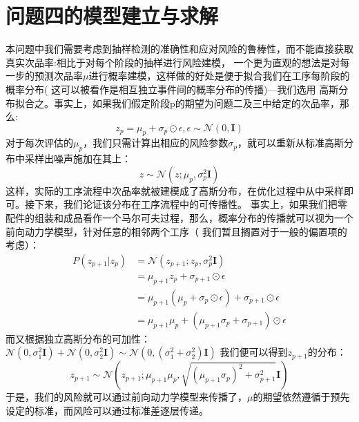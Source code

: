 \documentclass[withoutpreface,bwprint]{cumcmthesis} %
\begin{document}
\section{问题四的模型建立与求解}
本问题中我们需要考虑到抽样检测的准确性和应对风险的鲁棒性，而不能直接获取真实次品率:相比于对每个阶段的抽样进行风险建模，
一个更为直观的想法是对每一步的预测次品率$\mu$进行概率建模，这样做的好处是便于拟合我们在工序每阶段的概率分布(
这可以被看作是相互独立事件间的概率分布的传播)---我们选用
高斯分布拟合之。事实上，如果我们假定阶段p的期望为问题二及三中给定的次品率，那么:
\begin{equation}
	z_p = \mu_p + \sigma_p \odot \epsilon, \epsilon \sim \mathcal{N}(0, \mathbf{I})
\end{equation}
对于每次评估的$\mu_p$，我们只需计算出相应的风险参数$\sigma_p$，就可以重新从标准高斯分布中采样出噪声施加在其上：
\begin{equation}
	z \sim \mathcal{N}(z; \mu_p, \sigma_p^2 \mathbf{I})
\end{equation}
这样，实际的工序流程中次品率就被建模成了高斯分布，在优化过程中从中采样即可。接下来，我们论证该分布在工序流程中的可传播性。
事实上，如果我们把零配件的组装和成品看作一个马尔可夫过程，那么，概率分布的传播就可以视为一个前向动力学模型，针对任意的相邻两个工序（
我们暂且搁置对于一般的偏置项的考虑）：
\begin{equation}
	\begin{split}
		P(z_{p+1} | z_p) &= \mathcal{N}(z_{p+1};z_p, \sigma_p^2 \mathbf{I}) \\
		&= \mu_{p+1}z_p + \sigma_{p+1} \odot \epsilon \\
		& = \mu_{p+1}(\mu_p + \sigma_p \odot \epsilon) + \sigma_{p+1} \odot \epsilon \\
		& = \mu_{p+1}\mu_p + (\mu_{p+1}\sigma_p + \sigma_{p+1} )\odot \epsilon
	\end{split}
\end{equation}
而又根据独立高斯分布的可加性：$\mathcal{N}(0, \sigma_1^2 \mathbf{I}) + \mathcal{N}(0, \sigma_2^2 \mathbf{I}) \sim \mathcal{N}(0, (\sigma_1^2 + \sigma_2^2) \mathbf{I})$
我们便可以得到$z_{p+1}$的分布：
\begin{equation}
	z_{p+1} \sim \mathcal{N}(z_{p+1}; \mu_{p+1}\mu_p, \sqrt{(\mu_{p+1}\sigma_p)^2 +\sigma_{p+1}^2}\mathbf{I})
\end{equation}
于是，我们的风险就可以通过前向动力学模型来传播了，$\mu$的期望依然遵循于预先设定的标准，而风险可以通过标准差逐层传递。
\end{document}
